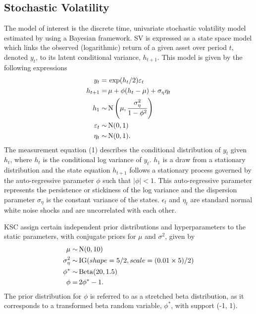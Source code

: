 \documentclass[12pt, a4paper]{article}
\begin{document}
\subsection{Stochastic Volatility}
    The model of interest is the discrete time, univariate stochastic volatility model estimated by \citet{kim1998stochastic} using a Bayesian framework. SV is expressed as a state space model which links the observed (logarithmic) return of a given asset over period $t$, denoted $y_t$, to its latent conditional variance, $h_{t+1}$. This model is given by the following expressions
    \begin{align}
    y_t =& \space \,\exp(h_t/2) \varepsilon_t \\
    h_{t+1} =& \space \, \mu +\phi(h_t - \mu) + \sigma_{\eta} \eta_t  \\
    h_1 \sim& \space \,\mathrm{N}\left(\mu, \frac{\sigma_{\eta}^2}{1-\phi^2}\right) \\
    \varepsilon_t \sim& \space \,\mathrm{N}(0,1) \\
    \eta_t \sim& \space \,\mathrm{N}(0,1).
    \end{align}
    The measurement equation (1) describes the conditional distribution of $y_t$ given $h_t$, where $h_t$ is the conditional log variance of $y_t$. $h_1$ is a draw from a stationary distribution and the state equation $h_{t+1}$ follows a stationary process governed by the auto-regressive parameter $\phi$ such that $|\phi|<1$. This auto-regressive parameter represents the persistence or stickiness of the log variance and the dispersion parameter $\sigma_{\eta}$ is the constant variance of the states. $\epsilon_t$ and $\eta_t$ are standard normal white noise shocks and are uncorrelated with each other.

    KSC assign certain independent prior distributions and hyperparameters to the static parameters, with conjugate priors for $\mu$ and $\sigma^2$, given by
    \begin{align}
    \mu \sim& \space \,\mathrm{N}(0, 10) \\
    \sigma_{\eta}^2 \sim& \space \, \mathrm{IG}(shape=5/2, scale=(0.01\times 5) / 2) \\
    \phi^{\ast} \sim& \space \,\mathrm{Beta}(20, 1.5) \\
    \phi =& \space \, 2\phi^{\ast} - 1.
    \end{align}
    The prior distribution for $\phi$ is referred to as a stretched beta distribution, as it corresponds to a transformed beta random variable, $\phi^*$, with support (-1, 1).
    
\end{document}

